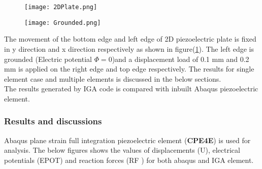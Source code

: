 \documentclass[11pt]{article}
\begin{document}
\begin{figure}[H]
	\centering
	\begin{minipage}{.5\textwidth}
		\centering
		\texttt{[image: 2DPlate.png]}
		\label{2Dplate}
	\end{minipage}%
	\begin{minipage}{.5\textwidth}
		\centering
		\texttt{[image: Grounded.png]}
		\label{Loading}
	\end{minipage}
\end{figure}
The movement of the bottom edge and left edge of 2D piezoelectric plate is fixed
in y direction and x direction respectively as shown in figure(\ref{Loading}).
The left edge is grounded (Electric potential $\Phi = 0$)and a displacement load
of 0.1 mm and 0.2 mm is applied on the right edge and top edge respectively. The
results for single element case and multiple elements is discussed in the below
sections. \\
The results generated by IGA code is compared with inbuilt Abaqus piezoelectric
element.
\subsubsection{Results and discussions}
Abaqus plane strain full integration piezoelectric element (\textbf{CPE4E}) is used for analysis. The below figures shows the values of displacements (U), electrical potentials (EPOT) and reaction forces (RF ) for both abaqus and IGA element.

\newpage
\end{document}
